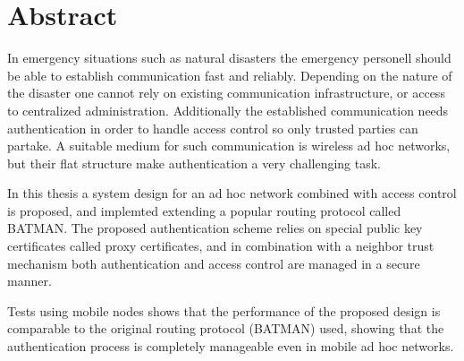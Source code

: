 \chapter*{Abstract}


In emergency situations such as natural disasters the emergency personell should
be able to establish communication fast and reliably. Depending on the nature of
the disaster one cannot rely on existing communication infrastructure, or access
to centralized administration. Additionally the established communication needs
authentication in order to handle access control so only trusted parties can
partake. A suitable medium for such communication is wireless ad hoc networks,
but their flat structure make authentication a very challenging task.


In this thesis a system design for an ad hoc network combined with access
control is proposed, and implemted extending a popular routing protocol called
BATMAN. The proposed authentication scheme relies on special public key
certificates called proxy certificates, and in combination with a neighbor trust
mechanism both authentication and access control are managed in a secure manner.


Tests using mobile nodes shows that the performance of the proposed design is
comparable to the original routing protocol (BATMAN) used, showing that the
authentication process is completely manageable even in mobile ad hoc networks.